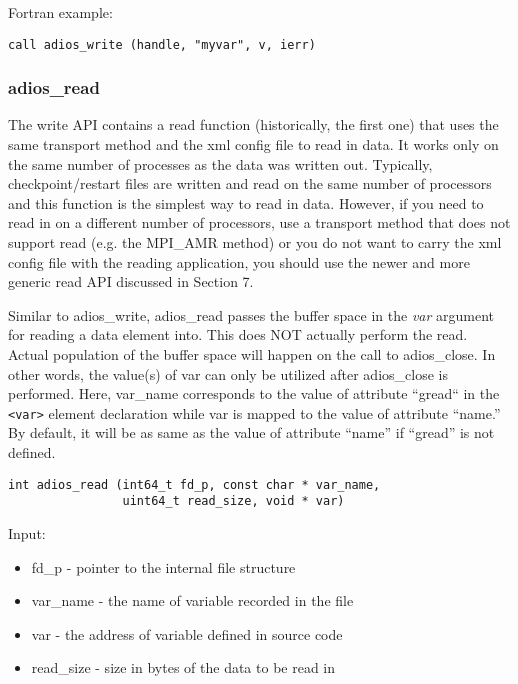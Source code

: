 Fortran example: 
\begin{lstlisting}[alsolanguage=Fortran,caption={},label={}]
call adios_write (handle, "myvar", v, ierr)
\end{lstlisting}

\subsubsection{adios\_read}
\label{section:adios_read}

The write API contains a read function (historically, the first one) that uses 
the same transport method and the xml config file to read in data. It works only 
on the same number of processes as the data was written out. Typically, checkpoint/restart 
files are written and read on the same number of processors and this function is 
the simplest way to read in data. However, if you need to read in on a different 
number of processors, use a transport method that does not support read (e.g. 
the MPI\_AMR method) or you do not want to carry the xml config file with the 
reading application, you should use the newer and more generic read API discussed 
in Section 7.

Similar to adios\_write, adios\_read passes the buffer space in the \textit{var} argument 
for reading a data element into. This does NOT actually perform the read. Actual 
population of the buffer space will happen on the call to adios\_close. In other 
words, the value(s) of var can only be utilized after adios\_close is performed. 
Here, var\_name corresponds to the value of attribute ``gread`` in the \verb+<var>+
element declaration while var is mapped to the value of attribute ``name.'' By 
default, it will be as same as the value of attribute ``name'' if ``gread'' is 
not defined.

\begin{lstlisting}[alsolanguage=C,caption={},label={}]
int adios_read (int64_t fd_p, const char * var_name, 
                uint64_t read_size, void * var)
\end{lstlisting}

Input:

\begin{itemize}
\item fd\_p - pointer to the internal file structure
\item var\_name - the name of variable recorded in the file
\item var - the address of variable defined in source code
\item read\_size -  size in bytes of the data to be read in 
\end{itemize}


